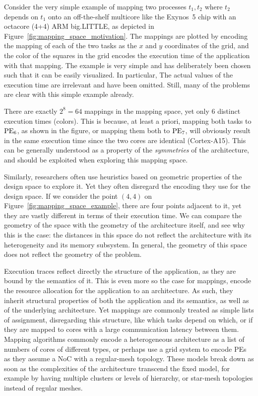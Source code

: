 Consider the very simple example of mapping two processes $t_1,t_2$ where $t_2$ depends on $t_1$ onto an off-the-shelf multicore like the Exynos~5 chip with an octacore (4+4) ARM big.LITTLE\texttrademark, as depicted in Figure~\ref{fig:mapping_space_motivation}.
The mappings are plotted by encoding the mapping of each of the two tasks as the $x$ and $y$ coordinates of the grid, and the color of the squares in the grid encodes the execution time of the application with that mapping.
The example is very simple and has deliberately been chosen such that it can be easily visualized. In particular, The actual values of the execution time are irrelevant and have been omitted.
Still, many of the problems are clear with this simple example already.

There are exactly $2^8 = 64$ mappings in the mapping space, yet only 6 distinct execution times (colors).
This is because, at least a priori, mapping both tasks to $\operatorname{PE}_6$, as shown in the figure, or mapping them both to $\operatorname{PE}_7$, will obviously result in the same execution time since the two cores are identical (Cortex-A15\texttrademark).
This can be generally understood as a property of the \emph{symmetries} of the architecture, and should be exploited when exploring this mapping space.

Similarly, researchers often use heuristics based on geometric properties of the design space to explore it.
Yet they often disregard the encoding they use for the design space.
If we consider the point $(4,4)$ on Figure~\ref{fig:mapping_space_example}, there are four points adjacent to it, yet they are vastly different in terms of their execution time.
We can compare the geometry of the space with the geometry of the architecture itself, and see why this is the case: the distances in this space do not reflect the architecture with its heterogeneity and its memory subsystem.
In general, the geometry of this space does not reflect the geometry of the problem. 

Execution traces reflect directly the structure of the application, as they are bound by the semantics of it.
This is even more so the case for mappings, encode the resource allocation for the application to an architecture.
As such, they inherit structural properties of both the application and its semantics, as well as of the underlying architecture.
Yet mappings are commonly treated as simple lists of assignment, disregarding this structure, like which tasks depend on which, or if they are mapped to cores with a large communication latency between them.
Mapping algorithms commonly encode a heterogeneous architecture as a list of numbers of cores of different types, or perhaps use a grid system to encode \acp{PE} as they assume a \ac{NoC} with a regular-mesh topology.
These models break down as soon as the complexities of the architecture transcend the fixed model, for example by having multiple clusters or levels of hierarchy, or star-mesh topologies instead of regular meshes.

